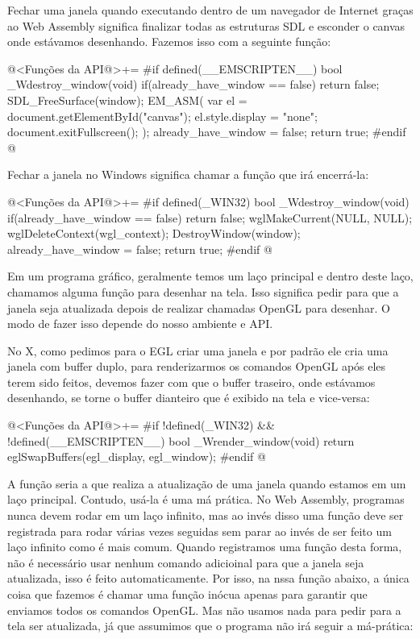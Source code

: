 Fechar uma janela quando executando dentro de um navegador de Internet
graças ao Web Assembly significa finalizar todas as estruturas SDL e
esconder o canvas onde estávamos desenhando. Fazemos isso com a
seguinte função:

\iniciocodigo
@<Funções da API@>+=
#if defined(__EMSCRIPTEN__)
bool _Wdestroy_window(void){
  if(already_have_window == false)
    return false;
  SDL_FreeSurface(window);
  EM_ASM(
    var el = document.getElementById("canvas");
    el.style.display = "none";
    document.exitFullscreen();
  );
  already_have_window = false;
  return true;
}
#endif
@
\fimcodigo


Fechar a janela no Windows significa chamar a  função que irá
encerrá-la:

\iniciocodigo
@<Funções da API@>+=
#if defined(_WIN32)
bool _Wdestroy_window(void){
  if(already_have_window == false)
    return false;
  wglMakeCurrent(NULL, NULL);
  wglDeleteContext(wgl_context);
  DestroyWindow(window);
  already_have_window = false;
  return true;
}
#endif
@
\fimcodigo


Em um programa gráfico, geralmente temos um laço principal e dentro
deste laço, chamamos alguma função para desenhar na tela. Isso
significa pedir para que a janela seja atualizada depois de realizar
chamadas OpenGL para desenhar. O modo de fazer isso depende do nosso
ambiente e API.


No X, como pedimos para o EGL criar uma janela e por padrão ele cria
uma janela com buffer duplo, para renderizarmos os comandos OpenGL
após eles terem sido feitos, devemos fazer com que o buffer traseiro,
onde estávamos desenhando, se torne o buffer dianteiro que é exibido
na tela e vice-versa:

\iniciocodigo
@<Funções da API@>+=
#if !defined(_WIN32) && !defined(__EMSCRIPTEN__)
bool _Wrender_window(void){
  return eglSwapBuffers(egl_display, egl_window);
}
#endif
@
\fimcodigo


A função  seria a que realiza a
atualização de uma janela quando estamos em um laço
principal. Contudo, usá-la é uma má prática. No Web Assembly,
programas nunca devem rodar em um laço infinito, mas ao invés disso
uma função deve ser registrada para rodar várias vezes seguidas sem
parar ao invés de ser feito um laço infinito como é mais comum. Quando
registramos uma função desta forma, não é necessário usar nenhum
comando adicioinal para que a janela seja atualizada, isso é feito
automaticamente. Por isso, na nssa função abaixo, a única coisa que
fazemos é chamar uma função inócua apenas para garantir que enviamos
todos os comandos OpenGL. Mas não usamos nada para pedir para a tela
ser atualizada, já que assumimos que o programa não irá seguir a
má-prática:

